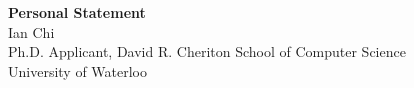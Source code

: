 \documentclass[11pt]{article}
\begin{document}
\begin{center}
    {\Large \textbf{Personal Statement}}\\[4pt]
    {\large Ian Chi}\\[2pt]
    Ph.D. Applicant, David R. Cheriton School of Computer Science\\
    University of Waterloo
\end{center}

\vspace{1em}

\end{document}
